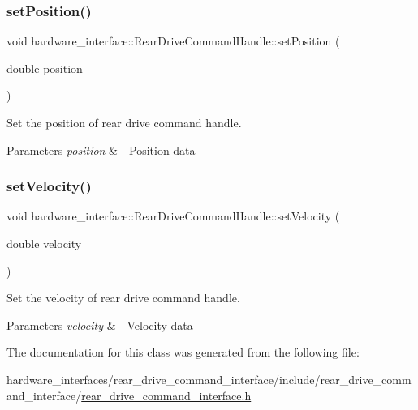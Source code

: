 \subsubsection{\texorpdfstring{set\+Position()}{setPosition()}}
{\footnotesize\ttfamily void hardware\+\_\+interface\+::\+Rear\+Drive\+Command\+Handle\+::set\+Position (\begin{DoxyParamCaption}\item[{double}]{position }\end{DoxyParamCaption})\hspace{0.3cm}{\ttfamily [inline]}}



Set the position of rear drive command handle. 


\begin{DoxyParams}{Parameters}
{\em position} & -\/ Position data \\
\hline
\end{DoxyParams}
\mbox{\label{classhardware__interface_1_1RearDriveCommandHandle_a1a67757268ecfac2b02f22f686c94097}} 
\subsubsection{\texorpdfstring{set\+Velocity()}{setVelocity()}}
{\footnotesize\ttfamily void hardware\+\_\+interface\+::\+Rear\+Drive\+Command\+Handle\+::set\+Velocity (\begin{DoxyParamCaption}\item[{double}]{velocity }\end{DoxyParamCaption})\hspace{0.3cm}{\ttfamily [inline]}}



Set the velocity of rear drive command handle. 


\begin{DoxyParams}{Parameters}
{\em velocity} & -\/ Velocity data \\
\hline
\end{DoxyParams}


The documentation for this class was generated from the following file\+:\begin{DoxyCompactItemize}
\item 
hardware\+\_\+interfaces/rear\+\_\+drive\+\_\+command\+\_\+interface/include/rear\+\_\+drive\+\_\+command\+\_\+interface/\hyperlink{rear__drive__command__interface_8h}{rear\+\_\+drive\+\_\+command\+\_\+interface.\+h}\end{DoxyCompactItemize}
